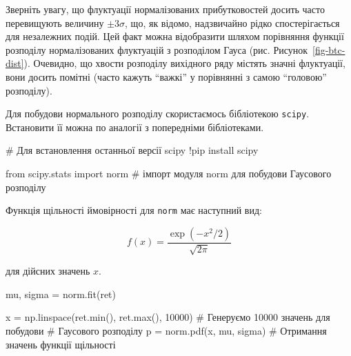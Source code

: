 \documentclass[
  letterpaper,
]{report}
\newenvironment{Shaded}{\begin{snugshade}}{\end{snugshade}}
\newcommand{\BuiltInTok}[1]{\textcolor[rgb]{0.00,0.23,0.31}{#1}}
\newcommand{\CommentTok}[1]{\textcolor[rgb]{0.37,0.37,0.37}{#1}}
\newcommand{\DecValTok}[1]{\textcolor[rgb]{0.68,0.00,0.00}{#1}}
\newcommand{\ImportTok}[1]{\textcolor[rgb]{0.00,0.46,0.62}{#1}}
\newcommand{\NormalTok}[1]{\textcolor[rgb]{0.00,0.23,0.31}{#1}}
\newcommand{\OperatorTok}[1]{\textcolor[rgb]{0.37,0.37,0.37}{#1}}
\begin{document}
Зверніть увагу, що флуктуації нормалізованих прибутковостей досить часто
перевищують величину \(\pm 3\sigma\), що, як відомо, надзвичайно рідко
спостерігається для незалежних подій. Цей факт можна відобразити шляхом
порівняння функції розподілу нормалізованих флуктуацій з розподілом
Гауса (рис. Рисунок~\ref{fig-btc-dist}). Очевидно, що хвости розподілу
вихідного ряду містять значні флуктуації, вони досить помітні (часто
кажуть ``важкі'' у порівнянні з самою ``головою'' розподілу).

Для побудови нормального розподілу скористаємось бібліотекою
\texttt{scipy}. Встановити її можна по аналогії з попередніми
бібліотеками.

\begin{Shaded}
\begin{Highlighting}[]
\CommentTok{\# Для встановлення останньої версії scipy}
\OperatorTok{!}\NormalTok{pip install scipy}
\end{Highlighting}
\end{Shaded}

\begin{Shaded}
\begin{Highlighting}[]
\ImportTok{from}\NormalTok{ scipy.stats }\ImportTok{import}\NormalTok{ norm }\CommentTok{\# імпорт модуля norm для побудови Гаусового розподілу}
\end{Highlighting}
\end{Shaded}

Функція щільності ймовірності для \texttt{norm} має наступний вид:

\[
    f(x) = \frac{\exp{(-x^2/2)}}{\sqrt{2\pi}}
\]

для дійсних значень \(x\).

\begin{Shaded}
\begin{Highlighting}[]
\NormalTok{mu, sigma }\OperatorTok{=}\NormalTok{ norm.fit(ret)}

\NormalTok{x }\OperatorTok{=}\NormalTok{ np.linspace(ret.}\BuiltInTok{min}\NormalTok{(), ret.}\BuiltInTok{max}\NormalTok{(), }\DecValTok{10000}\NormalTok{) }\CommentTok{\# Генеруємо 10000 значень для побудови }
                                             \CommentTok{\# Гаусового розподілу}
\NormalTok{p }\OperatorTok{=}\NormalTok{ norm.pdf(x, mu, sigma)                   }\CommentTok{\# Отримання значень функції щільності}
\end{Highlighting}
\end{Shaded}
\end{document}
